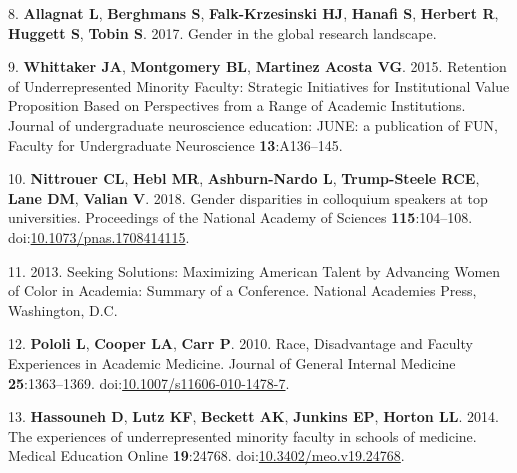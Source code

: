 \documentclass[10pt,]{article}
\begin{document}
\hypertarget{ref-allagnat_gender_2017}{}
8. \textbf{Allagnat L}, \textbf{Berghmans S}, \textbf{Falk-Krzesinski
HJ}, \textbf{Hanafi S}, \textbf{Herbert R}, \textbf{Huggett S},
\textbf{Tobin S}. 2017. Gender in the global research landscape.

\hypertarget{ref-whittaker_retention_2015}{}
9. \textbf{Whittaker JA}, \textbf{Montgomery BL}, \textbf{Martinez
Acosta VG}. 2015. Retention of Underrepresented Minority Faculty:
Strategic Initiatives for Institutional Value Proposition Based on
Perspectives from a Range of Academic Institutions. Journal of
undergraduate neuroscience education: JUNE: a publication of FUN,
Faculty for Undergraduate Neuroscience \textbf{13}:A136--145.

\hypertarget{ref-nittrouer_gender_2018}{}
10. \textbf{Nittrouer CL}, \textbf{Hebl MR}, \textbf{Ashburn-Nardo L},
\textbf{Trump-Steele RCE}, \textbf{Lane DM}, \textbf{Valian V}. 2018.
Gender disparities in colloquium speakers at top universities.
Proceedings of the National Academy of Sciences \textbf{115}:104--108.
doi:\href{https://doi.org/10.1073/pnas.1708414115}{10.1073/pnas.1708414115}.

\hypertarget{ref-noauthor_seeking_2013}{}
11. 2013. Seeking Solutions: Maximizing American Talent by Advancing
Women of Color in Academia: Summary of a Conference. National Academies
Press, Washington, D.C.

\hypertarget{ref-pololi_race_2010}{}
12. \textbf{Pololi L}, \textbf{Cooper LA}, \textbf{Carr P}. 2010. Race,
Disadvantage and Faculty Experiences in Academic Medicine. Journal of
General Internal Medicine \textbf{25}:1363--1369.
doi:\href{https://doi.org/10.1007/s11606-010-1478-7}{10.1007/s11606-010-1478-7}.

\hypertarget{ref-hassouneh_experiences_2014}{}
13. \textbf{Hassouneh D}, \textbf{Lutz KF}, \textbf{Beckett AK},
\textbf{Junkins EP}, \textbf{Horton LL}. 2014. The experiences of
underrepresented minority faculty in schools of medicine. Medical
Education Online \textbf{19}:24768.
doi:\href{https://doi.org/10.3402/meo.v19.24768}{10.3402/meo.v19.24768}.
\end{document}
